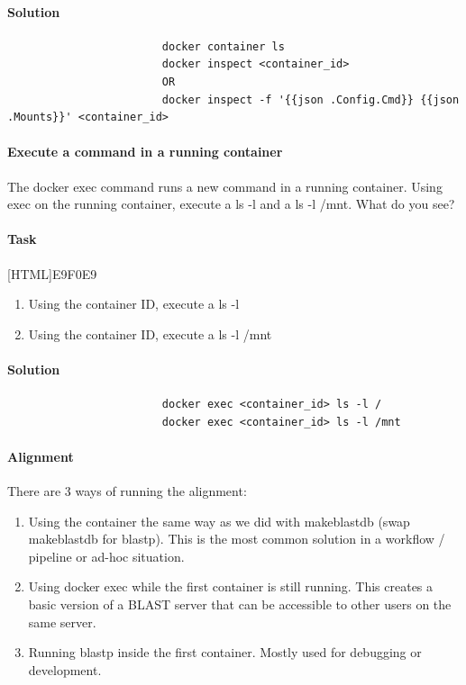 \documentclass[12pt]{article}
\begin{document}
			\paragraph{Solution}	
	
				\begin{minipage}{\linewidth}
					\begin{lstlisting}
						docker container ls
						docker inspect <container_id>
						OR 
						docker inspect -f '{{json .Config.Cmd}} {{json .Mounts}}' <container_id>
					\end{lstlisting}
				\end{minipage}		
	
			\paragraph{Execute a command in a running container}
				The docker exec command runs a new command in a running container.
			Using exec on the running container, execute a ls -l and a ls -l /mnt.
			What do you see?
	
			\paragraph{Task}
				[HTML]{E9F0E9}{\parbox{\linewidth}{%
						\begin{enumerate}
							\item Using the container ID, execute a ls -l
							\item Using the container ID, execute a ls -l /mnt
						\end{enumerate}
				}}

			\paragraph{Solution}	
	
				\begin{minipage}{\linewidth}
					\begin{lstlisting}
						docker exec <container_id> ls -l /
						docker exec <container_id> ls -l /mnt
					\end{lstlisting}
				\end{minipage}
			
			\paragraph{Alignment}
			
			There are 3 ways of running the alignment:
			\begin{enumerate}
				\item Using the container the same way as we did with makeblastdb (swap makeblastdb for blastp). This is the most common solution in a workflow / pipeline or ad-hoc situation.
				\item Using docker exec while the first container is still running. This creates a basic version of a BLAST server that can be accessible to other users on the same server.
				\item Running blastp inside the first container. Mostly used for debugging or development.
			\end{enumerate}
			
\end{document}
